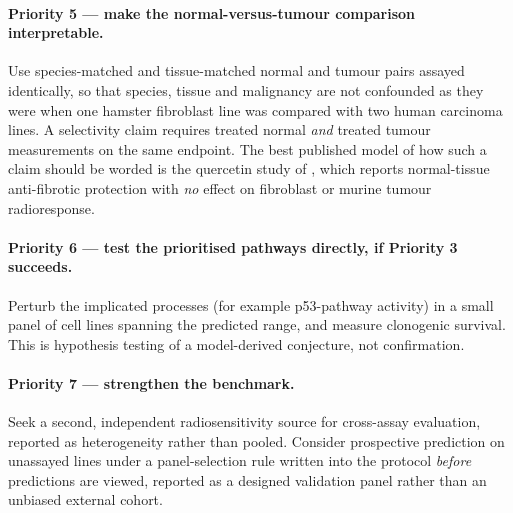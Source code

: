 \paragraph{Priority 5 --- make the normal-versus-tumour comparison interpretable.} Use
species-matched and tissue-matched normal and tumour pairs assayed identically, so that
species, tissue and malignancy are not confounded as they were when one hamster fibroblast
line was compared with two human carcinoma lines. A selectivity claim requires treated normal
\emph{and} treated tumour measurements on the same endpoint. The best published model of how
such a claim should be worded is the quercetin study of \textcite{horton2013}, which reports
normal-tissue anti-fibrotic protection with \emph{no} effect on fibroblast or murine tumour
radioresponse.

\paragraph{Priority 6 --- test the prioritised pathways directly, if Priority 3 succeeds.}
Perturb the implicated processes (for example p53-pathway activity) in a small panel of cell
lines spanning the predicted range, and measure clonogenic survival. This is hypothesis
testing of a model-derived conjecture, not confirmation.

\paragraph{Priority 7 --- strengthen the benchmark.} Seek a second, independent
radiosensitivity source for cross-assay evaluation, reported as heterogeneity rather than
pooled. Consider prospective prediction on unassayed lines under a panel-selection rule
written into the protocol \emph{before} predictions are viewed, reported as a designed
validation panel rather than an unbiased external cohort.

